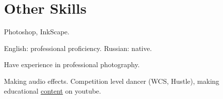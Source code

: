 \documentclass{article}
\begin{document}
\section{Other Skills}
\begin{description}[widest=Langauges]
\item[Software]  Photoshop, InkScape.
\item[Languages] English: professional proficiency.  Russian: native.
\item[Photography] Have experience in professional photography.
\item[Hobbies] Making audio effects. Competition level dancer (WCS, Hustle), making educational \href{https://www.youtube.com/channel/UCAjmXQnYQjWoVHx6NIo24CQ}{content} on youtube.
\end{description}
 
\end{document}
